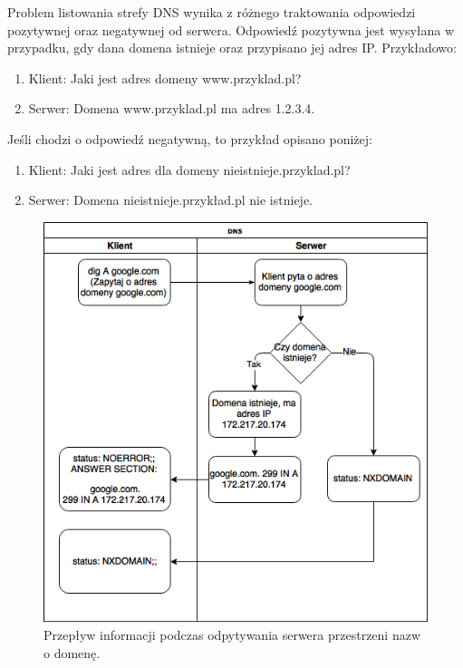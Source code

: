 Problem listowania strefy DNS wynika z różnego traktowania odpowiedzi pozytywnej oraz negatywnej od serwera. Odpowiedź pozytywna
jest wysyłana w przypadku, gdy dana domena istnieje oraz przypisano jej adres IP. Przykładowo:
\begin{enumerate}
	\item Klient: Jaki jest adres domeny www.przyklad.pl?
	\item Serwer: Domena www.przyklad.pl ma adres 1.2.3.4.
\end{enumerate}
Jeśli chodzi o odpowiedź negatywną, to przykład opisano poniżej:
\begin{enumerate}
	\item Klient: Jaki jest adres dla domeny nieistnieje.przyklad.pl?
	\item Serwer: Domena nieistnieje.przykład.pl nie istnieje.
\end{enumerate}
\begin{center}
	\begin{figure}[h]
	\centering
	\includegraphics[scale=0.7]{image/nxdomain}
	\caption{Przepływ informacji podczas odpytywania serwera przestrzeni nazw o domenę.}
	\label{fig:dns_nxdomain}
	\end{figure}
\end{center}

